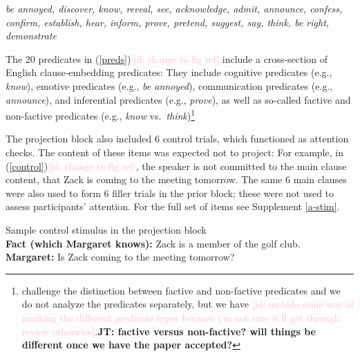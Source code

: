 \documentclass[11pt,fleqn]{article}
\newcommand{\jd}[1]{\textcolor{Pink}{[jd: #1]}}
\newcommand{\jt}[1]{\textbf{\color{blue}JT: #1}}
\newcommand{\6}{\mbox{$[\hspace*{-.6mm}[$}}
\newcommand{\9}{\mbox{$]\hspace*{-.6mm}]$}}
\begin{document}
\begin{exe}
\ex\label{preds} %

{\em be annoyed, discover, know, reveal, see, acknowledge, admit, announce, confess, confirm, establish, hear, inform, prove, pretend, suggest, say, think, be right, demonstrate}
\end{exe}
The 20 predicates in (\ref{preds})\jd{change to fig ref} include a cross-section of English clause-embedding predicates: They include cognitive predicates (e.g., {\em know}), emotive predicates (e.g., {\em be annoyed}), communication predicates (e.g., {\em announce}), and inferential predicates (e.g., {\em prove}), as well as so-called factive and non-factive predicates (e.g., {\em know} vs.\ {\em think})\footnote{ challenge the distinction between factive and non-factive predicates and we do not analyze the predicates separately, but we have \jd{include some way of marking the different predicate types because i'm not sure it'll get through review otherwise}.\jt{factive versus non-factive? will things be different once we have the paper accepted?}}

The projection block also included 6 control trials, which functioned as attention checks. The content of these items was expected not to project: For example, in (\ref{control})\jd{change to fig ref}, the speaker is not committed to the main clause content, that Zack is coming to the meeting tomorrow. %
The same 6 main clauses were also used to form 6 filler trials in the prior block; these were not used to assess participants' attention. For the full set of items see Supplement \ref{a-stim}.

\begin{exe}
\ex\label{control} Sample control stimulus in the projection block \\ {\bf Fact (which Margaret knows):}  Zack is a member of the golf club. \\ {\bf Margaret:} Is Zack coming to the meeting tomorrow?
\end{exe}

\end{document}
